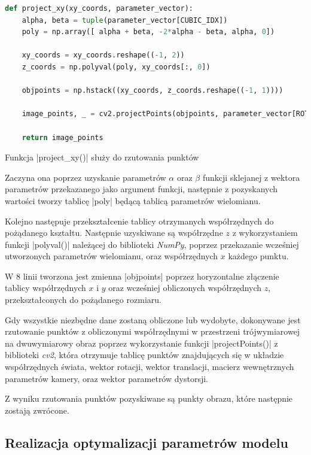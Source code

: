 \begin{lstlisting}[caption={\pyth|project_xy()| - funkcja rzutująca punkty}, label={project-xy}, language=Python]
def project_xy(xy_coords, parameter_vector):	
	alpha, beta = tuple(parameter_vector[CUBIC_IDX])
	poly = np.array([ alpha + beta, -2*alpha - beta, alpha, 0])
	
	xy_coords = xy_coords.reshape((-1, 2))
	z_coords = np.polyval(poly, xy_coords[:, 0])
	
	objpoints = np.hstack((xy_coords, z_coords.reshape((-1, 1))))
	
	image_points, _ = cv2.projectPoints(objpoints, parameter_vector[ROTATION_VECTOR_IDX], parameter_vector[TRANSLATION_VECTOR_IDX], CAMERA_MATRIX, np.zeros(5))
	
	return image_points
\end{lstlisting}

Funkcja \pyth|project_xy()| służy do rzutowania punktów 

Zaczyna ona poprzez uzyskanie parametrów $\alpha$ oraz $\beta$ funkcji sklejanej z wektora parametrów przekazanego jako argument funkcji, następnie z pozyskanych wartości tworzy tablicę \pyth|poly| będącą tablicą parametrów wielomianu.

Kolejno następuje przekształcenie tablicy otrzymanych współrzędnych do pożądanego kształtu. Następnie uzyskiwane są współrzędne $z$ z wykorzystaniem funkcji \pyth|polyval()| należącej do biblioteki \textit{NumPy}, poprzez przekazanie wcześniej utworzonych parametrów wielomianu, oraz współrzędnych $x$ każdego punktu.

W 8 linii tworzona jest zmienna \pyth|objpoints| poprzez horyzontalne złączenie tablicy współrzędnych $x$ i $y$ oraz wcześniej obliczonych współrzędnych $z$, przekształconych do pożądanego rozmiaru.

Gdy wszystkie niezbędne dane zostaną obliczone lub wydobyte, dokonywane jest rzutowanie punktów z obliczonymi współrzędnymi w przestrzeni trójwymiarowej na dwuwymiarowy obraz poprzez wykorzystanie funkcji \pyth|projectPoints()| z biblioteki \textit{cv2}, która otrzymuje tablicę punktów znajdujących się w układzie współrzędnych świata, wektor rotacji, wektor translacji, macierz wewnętrznych parametrów kamery, oraz wektor parametrów dystorsji. 

Z wyniku rzutowania punktów pozyskiwane są punkty obrazu, które następnie zostają zwrócone.


\subsection{Realizacja optymalizacji parametrów modelu}

